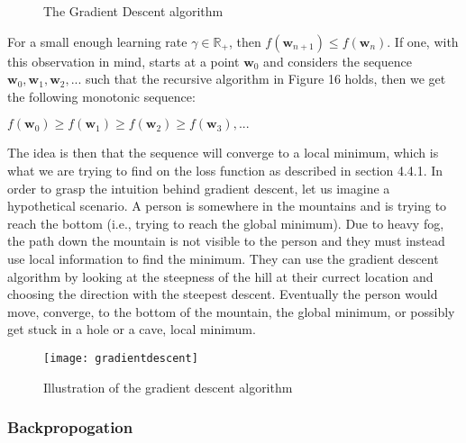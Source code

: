 \documentclass[titlepage]{article}
\begin{document}
\vskip 0.3cm

\begin{figure}[h]
    \centerline{}
    \vskip 0.2cm
    \caption{The Gradient Descent algorithm}
\end{figure}

\vskip 0.3cm

\noindent
For a small enough learning rate $\gamma \in \mathbb{R}_{+}$, then  $f(\mathbf{w}_{n+1}) \leq f(\mathbf{w}_{n})$. If one, with this observation in mind, starts at a point $\mathbf{w}_{0}$ and considers the sequence $\mathbf{w}_{0}, \mathbf{w}_{1}, \mathbf{w}_{2}, ...$ such that the recursive algorithm in Figure 16 holds, then we get the following monotonic sequence:

\vskip 0.5cm

\centerline{$f(\mathbf{w}_{0}) \geq f(\mathbf{w}_{1}) \geq f(\mathbf{w}_{2}) \geq f(\mathbf{w}_{3}), ...$}

\vskip 0.5cm

\noindent
The idea is then that the sequence will converge \cite{skansi} to a local minimum, which is what we are trying to find on the loss function as described in section 4.4.1. In order to grasp the intuition behind gradient descent, let us imagine a hypothetical scenario. A person is somewhere in the mountains and is trying to reach the bottom (i.e., trying to reach the global minimum). Due to heavy fog, the path down the mountain is not visible to the person and they must instead use local information to find the minimum. They can use the gradient descent algorithm by looking at the steepness of the hill at their currect location and choosing the direction with the steepest descent. Eventually the person would move, converge, to the bottom of the mountain, the global minimum, or possibly get stuck in a hole or a cave, local minimum.

\begin{figure}[h]
    \center
    \texttt{[image: gradientdescent]}
    \caption{\scriptsize Illustration of the gradient descent algorithm}
\end{figure}

\newpage

\subsubsection{Backpropogation}

\vskip 0.2cm
\end{document}
